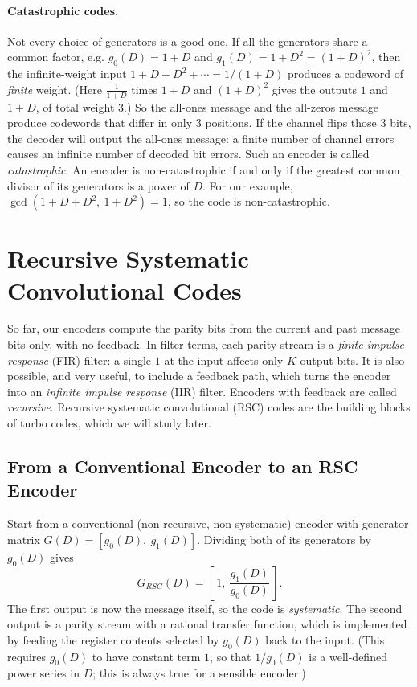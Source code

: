 \paragraph{Catastrophic codes.} Not every choice of generators is a good one. If all the generators share a common factor, e.g. \(g_0(D) = 1 + D\) and \(g_1(D) = 1 + D^2 = (1+D)^2\), then the infinite-weight input \(1 + D + D^2 + \cdots = 1/(1+D)\) produces a codeword of \emph{finite} weight. (Here \(\frac{1}{1+D}\) times \(1+D\) and \((1+D)^2\) gives the outputs \(1\) and \(1 + D\), of total weight \(3\).) So the all-ones message and the all-zeros message produce codewords that differ in only \(3\) positions. If the channel flips those \(3\) bits, the decoder will output the all-ones message: a finite number of channel errors causes an infinite number of decoded bit errors. Such an encoder is called \emph{catastrophic}. An encoder is non-catastrophic if and only if the greatest common divisor of its generators is a power of \(D\). For our example, \(\gcd(1 + D + D^2,\ 1 + D^2) = 1\), so the code is non-catastrophic.

\section{Recursive Systematic Convolutional Codes}\label{sec:rsc}
So far, our encoders compute the parity bits from the current and past message bits only, with no feedback. In filter terms, each parity stream is a \emph{finite impulse response} (FIR) filter: a single \(1\) at the input affects only \(K\) output bits. It is also possible, and very useful, to include a feedback path, which turns the encoder into an \emph{infinite impulse response} (IIR) filter. Encoders with feedback are called \emph{recursive}. Recursive systematic convolutional (RSC) codes are the building blocks of turbo codes, which we will study later.

\subsection{From a Conventional Encoder to an RSC Encoder}
Start from a conventional (non-recursive, non-systematic) encoder with generator matrix \(G(D) = [g_0(D),\ g_1(D)]\). Dividing both of its generators by \(g_0(D)\) gives
\[G_{RSC}(D) = \left[\,1,\ \frac{g_1(D)}{g_0(D)}\,\right].\]
The first output is now the message itself, so the code is \emph{systematic}. The second output is a parity stream with a rational transfer function, which is implemented by feeding the register contents selected by \(g_0(D)\) back to the input. (This requires \(g_0(D)\) to have constant term \(1\), so that \(1/g_0(D)\) is a well-defined power series in \(D\); this is always true for a sensible encoder.)

